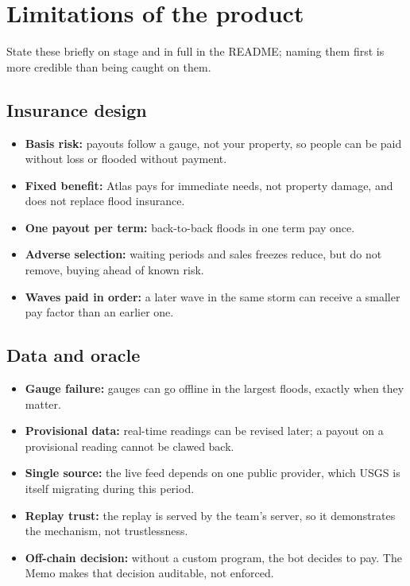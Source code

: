 \documentclass[11pt]{article}
\begin{document}
\section{Limitations of the product}

State these briefly on stage and in full in the README; naming them first is more credible than being caught on them.

\subsection{Insurance design}
\begin{itemize}
\item \textbf{Basis risk:} payouts follow a gauge, not your property, so people can be paid without loss or flooded without payment.
\item \textbf{Fixed benefit:} Atlas pays for immediate needs, not property damage, and does not replace flood insurance.
\item \textbf{One payout per term:} back-to-back floods in one term pay once.
\item \textbf{Adverse selection:} waiting periods and sales freezes reduce, but do not remove, buying ahead of known risk.
\item \textbf{Waves paid in order:} a later wave in the same storm can receive a smaller pay factor than an earlier one.
\end{itemize}

\subsection{Data and oracle}
\begin{itemize}
\item \textbf{Gauge failure:} gauges can go offline in the largest floods, exactly when they matter.
\item \textbf{Provisional data:} real-time readings can be revised later; a payout on a provisional reading cannot be clawed back.
\item \textbf{Single source:} the live feed depends on one public provider, which USGS is itself migrating during this period.
\item \textbf{Replay trust:} the replay is served by the team's server, so it demonstrates the mechanism, not trustlessness.
\item \textbf{Off-chain decision:} without a custom program, the bot decides to pay. The Memo makes that decision auditable, not enforced.
\end{itemize}
\end{document}
